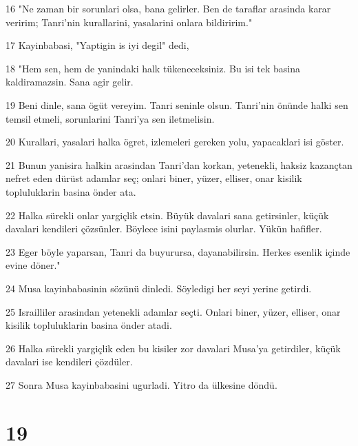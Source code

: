 \par 16 "Ne zaman bir sorunlari olsa, bana gelirler. Ben de taraflar arasinda karar veririm; Tanri'nin kurallarini, yasalarini onlara bildiririm."
\par 17 Kayinbabasi, "Yaptigin is iyi degil" dedi,
\par 18 "Hem sen, hem de yanindaki halk tükeneceksiniz. Bu isi tek basina kaldiramazsin. Sana agir gelir.
\par 19 Beni dinle, sana ögüt vereyim. Tanri seninle olsun. Tanri'nin önünde halki sen temsil etmeli, sorunlarini Tanri'ya sen iletmelisin.
\par 20 Kurallari, yasalari halka ögret, izlemeleri gereken yolu, yapacaklari isi göster.
\par 21 Bunun yanisira halkin arasindan Tanri'dan korkan, yetenekli, haksiz kazançtan nefret eden dürüst adamlar seç; onlari biner, yüzer, elliser, onar kisilik topluluklarin basina önder ata.
\par 22 Halka sürekli onlar yargiçlik etsin. Büyük davalari sana getirsinler, küçük davalari kendileri çözsünler. Böylece isini paylasmis olurlar. Yükün hafifler.
\par 23 Eger böyle yaparsan, Tanri da buyurursa, dayanabilirsin. Herkes esenlik içinde evine döner."
\par 24 Musa kayinbabasinin sözünü dinledi. Söyledigi her seyi yerine getirdi.
\par 25 Israilliler arasindan yetenekli adamlar seçti. Onlari biner, yüzer, elliser, onar kisilik topluluklarin basina önder atadi.
\par 26 Halka sürekli yargiçlik eden bu kisiler zor davalari Musa'ya getirdiler, küçük davalari ise kendileri çözdüler.
\par 27 Sonra Musa kayinbabasini ugurladi. Yitro da ülkesine döndü.

\chapter{19}

